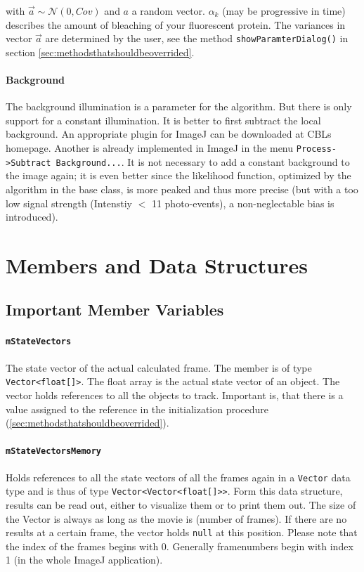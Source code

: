 \documentclass{scrartcl}
\begin{document}
with $\vec{a} \sim {\mathcal N}(0, Cov)$  and $a$ a random vector. $\alpha_k$ (may be progressive in time) describes the amount of bleaching of your fluorescent protein. The variances in vector $\vec{a}$ are determined by the user, see the method \texttt{showParamterDialog()} in section \ref{sec:methodsthatshouldbeoverrided}.

\paragraph{Background}
The background illumination is a parameter for the algorithm. But there is only support for a constant illumination. It is better to first subtract the local background. An appropriate plugin for ImageJ can be downloaded at CBLs homepage. Another is already implemented in ImageJ in the menu \texttt{Process->Subtract Background...}. It is not necessary to add a constant background to the image again; it is even better since the likelihood function, optimized by the algorithm in the base class, is more peaked and thus more precise (but with a too low signal strength (Intenstiy $<$ 11 photo-events), a non-neglectable bias is introduced). 

\section{Members and Data Structures}
\subsection{Important Member Variables}
\label{sec:importantmembervariables}
\paragraph{\texttt{mStateVectors}} The state vector of the actual calculated frame. The member is of type \lstinline[]{Vector<float[]>}. The float array is the actual state vector of an object. The vector holds references to all the objects to track. Important is, that there is a value assigned to the reference in the initialization procedure (\ref{sec:methodsthatshouldbeoverrided}).

\paragraph{\texttt{mStateVectorsMemory}} Holds references to all the state vectors of all the frames again in a \texttt{Vector} data type and is thus of type \lstinline[]{Vector<Vector<float[]>>}. Form this data structure, results can be read out, either to visualize them or to print them out. The size of the Vector is always as long as the movie is (number of frames). If there are no results at a certain frame, the vector holds \texttt{null} at this position. Please note that the index of the frames begins with 0. Generally framenumbers begin with index 1 (in the whole ImageJ application).
\end{document}

